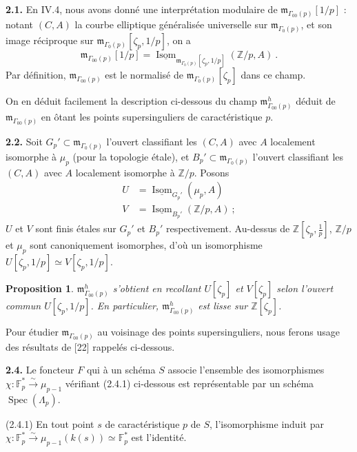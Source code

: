 \documentclass[10pt,a4paper]{amsart}
\theoremstyle{plain}
\newtheorem{proposition}[theorem]{Proposition}
\theoremstyle{definition}
\DeclareMathOperator{\Spec}{Spec}
\DeclareMathOperator{\Isom}{Isom}
\newcommand{\m}{\mathfrak{m}}
\newcommand{\FF}{\mathbb{F}}
\newcommand{\ZZ}{\mathbb{Z}}
\begin{document}
\setcounter{theorem}{0}
\setcounter{subsection}{1}
\setcounter{theorem}{0}

\medskip\noindent\textbf{2.1.} En IV.4, nous avons donn\'e une interpr\'etation modulaire de $\m_{\Gamma_{00}(p)}[1/p]$ : notant $(C,A)$ la courbe elliptique g\'en\'eralis\'ee universelle sur $\m_{\Gamma_0(p)}$, et son image r\'eciproque sur $\m_{\Gamma_0(p)}[\zeta_p, 1/p]$, on a
\[
\m_{\Gamma_{00}(p)}[1/p] = \underline{\Isom}_{\m_{\Gamma_0(p)}[\zeta_p, 1/p]}(\ZZ/p, A)\ .
\]
Par d\'efinition, $\m_{\Gamma_{00}(p)}$ est le normalis\'e de $\m_{\Gamma_0(p)}[\zeta_p]$ dans ce champ.

On en d\'eduit facilement la description ci-dessous du champ $\m_{\Gamma_{00}(p)}^h$ d\'eduit de $\m_{\Gamma_{00}(p)}$ en \^otant les points supersinguliers de caract\'eristique $p$.

\medskip\noindent\textbf{2.2.} Soit $G_p' \subset \m_{\Gamma_0(p)}$ l'ouvert classifiant les $(C,A)$ avec $A$ localement isomorphe \`a $\mu_p$ (pour la topologie \'etale), et $B_p' \subset \m_{\Gamma_0(p)}$ l'ouvert classifiant les $(C,A)$ avec $A$ localement isomorphe \`a $\ZZ/p$. Posons
\begin{align*}
U &= \underline{\Isom}_{G_p'}(\mu_p, A)\\
V &= \underline{\Isom}_{B_p'}(\ZZ/p, A)\ ;
\end{align*}
$U$ et $V$ sont finis \'etales sur $G_p'$ et $B_p'$ respectivement. Au-dessus de $\ZZ[\zeta_p, \frac{1}{p}]$, $\ZZ/p$ et $\mu_p$ sont canoniquement isomorphes, d'o\`u un isomorphisme $U[\zeta_p, 1/p] \simeq V[\zeta_p, 1/p]$.

\setcounter{theorem}{2}
\begin{proposition}
$\m_{\Gamma_{00}(p)}^h$ s'obtient en recollant $U[\zeta_p]$ et $V[\zeta_p]$ selon l'ouvert commun $U[\zeta_p, 1/p]$. En particulier, $\m_{\Gamma_{00}(p)}^h$ est lisse sur $\ZZ[\zeta_p]$.
\end{proposition}

Pour \'etudier $\m_{\Gamma_{00}(p)}$ au voisinage des points supersinguliers, nous ferons usage des r\'esultats de [22] rappel\'es ci-dessous.

\medskip\noindent\textbf{2.4.} Le foncteur $F$ qui \`a un sch\'ema $S$ associe l'ensemble des isomorphismes $\chi : \FF_p^* \xrightarrow{\sim} \mu_{p-1}$ v\'erifiant (2.4.1) ci-dessous est repr\'esentable par un sch\'ema $\Spec(\Lambda_p)$.

(2.4.1) En tout point $s$ de caract\'eristique $p$ de $S$, l'isomorphisme induit par $\chi : \FF_p^* \xrightarrow{\sim} \mu_{p-1}(k(s)) \simeq \FF_p^*$ est l'identit\'e.
\end{document}
